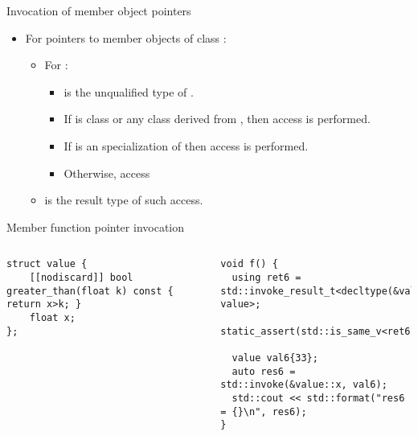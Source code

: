 \begin{frame}[t,fragile]{Invocation of member object pointers}
\begin{itemize}
  \item For pointers to member objects of class :
    \begin{itemize}
      \item For :
        \begin{itemize}
          \item {} is the unqualified type of .
          \item If  is class  or any class derived from ,
                then access  is performed.
          \item If  is an specialization of 
                then access  is performed.
          \item Otherwise,
                access 
        \end{itemize}
       \item {} 
             is the result type of such access.
    \end{itemize}
\end{itemize}
\begin{block}{Member function pointer invocation}
\begin{columns}[T]

\begin{lstlisting}[basicstyle=\mode<presentation>{\tiny}]
struct value {
    [[nodiscard]] bool greater_than(float k) const { return x>k; }
    float x;
};
\end{lstlisting}

\begin{lstlisting}[basicstyle=\mode<presentation>{\tiny}]
void f() {
  using ret6 = std::invoke_result_t<decltype(&value::x), value>;
  static_assert(std::is_same_v<ret6,float&&>);

  value val6{33};
  auto res6 = std::invoke(&value::x, val6);
  std::cout << std::format("res6 = {}\n", res6);
}
\end{lstlisting}
\end{columns}
\end{block}
\end{frame}
